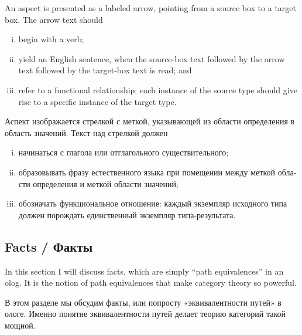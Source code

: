 \documentclass[a4paper]{book}
\theoremstyle{myth}
\newtheorem{rulesENG}[envENG]{\begin{english}Rules of good practice\end{english}}
\newtheorem{rulesRUS}[envRUS]{\begin{russian}Правила хорошего тона (рекомендации)\end{russian}}
\begin{document}
\begin{english}
\begin{rulesENG}\label{rules:aspects}
An aspect is presented as a labeled arrow, pointing from a source box to a target box.  The arrow text should
\begin{enumerate}[(i)]
\item begin with a verb;
\item yield an English sentence, when the source-box text followed by the arrow text followed by the target-box text is read; and
\item refer to a functional relationship: each instance of the source type should give rise to a specific instance of the target type.
\end{enumerate}
\end{rulesENG}

\begin{rulesRUS}\label{rules:aspects}
\begin{russian}Аспект изображается стрелкой с меткой, указывающей из области определения в область значений.  Текст над стрелкой должен
\begin{enumerate}[(i)]
\item начинаться с глагола или отглагольного существительного;
\item образовывать фразу естественного языка при помещении между меткой области определения и меткой области значений;
\item обозначать функциональное отношение: каждый экземпляр исходного типа должен порождать единственный экземпляр типа-результата.
\end{enumerate}\end{russian}
\end{rulesRUS}


\subsection{Facts / Факты}\label{sec:facts}

In this section I will discuss facts, which are simply “path equivalences” in an olog. It is the notion of path equivalences that make category theory so powerful. 

\begin{russian}В этом разделе мы обсудим факты, или попросту «эквивалентности путей» в ологе. Именно понятие эквивалентности путей делает теорию категорий такой мощной. \end{russian}


\end{english}
\end{document}
